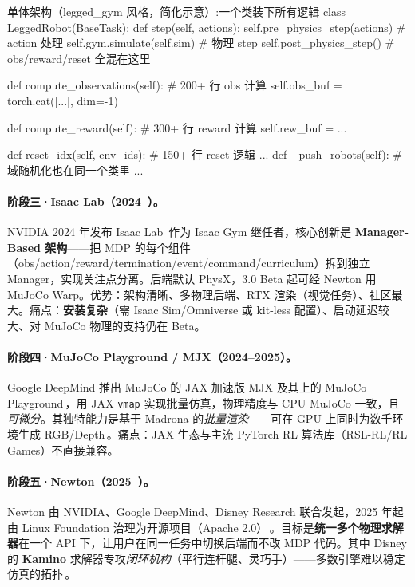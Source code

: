 \begin{codebox}[Python]{单体架构（legged\_gym 风格，简化示意）:一个类装下所有逻辑}
class LeggedRobot(BaseTask):
    def step(self, actions):
        self.pre_physics_step(actions)   # action 处理
        self.gym.simulate(self.sim)      # 物理 step
        self.post_physics_step()         # obs/reward/reset 全混在这里

    def compute_observations(self):      # 200+ 行 obs 计算
        self.obs_buf = torch.cat([...], dim=-1)

    def compute_reward(self):            # 300+ 行 reward 计算
        self.rew_buf = ...

    def reset_idx(self, env_ids):        # 150+ 行 reset 逻辑
        ...
    def _push_robots(self):              # 域随机化也在同一个类里
        ...
\end{codebox}

\paragraph{阶段三·Isaac Lab（2024--）。}NVIDIA 2024 年发布 Isaac Lab\,\cite{mittal2025isaaclab} 作为 Isaac Gym 继任者，核心创新是 \textbf{Manager-Based 架构}——把 MDP 的每个组件（obs/action/reward/termination/event/command/curriculum）拆到独立 Manager，实现关注点分离。后端默认 PhysX，3.0 Beta 起可经 Newton 用 MuJoCo Warp。优势：架构清晰、多物理后端、RTX 渲染（视觉任务）、社区最大。痛点：\textbf{安装复杂}（需 Isaac Sim/Omniverse 或 kit-less 配置）、启动延迟较大、对 MuJoCo 物理的支持仍在 Beta。

\paragraph{阶段四·MuJoCo Playground / MJX（2024--2025）。}Google DeepMind 推出 MuJoCo 的 JAX 加速版 MJX 及其上的 MuJoCo Playground\,\cite{zakka2025playground}，用 JAX \verb|vmap| 实现批量仿真，物理精度与 CPU MuJoCo 一致，且\emph{可微分}。其独特能力是基于 Madrona 的\emph{批量渲染}——可在 GPU 上同时为数千环境生成 RGB/Depth\,\cite{zakka2025playground}。痛点：JAX 生态与主流 PyTorch RL 算法库（RSL-RL/RL Games）不直接兼容。

\paragraph{阶段五·Newton（2025--）。}Newton 由 NVIDIA、Google DeepMind、Disney Research 联合发起，2025 年起由 Linux Foundation 治理为开源项目（Apache 2.0）\,\cite{newton2025}。目标是\textbf{统一多个物理求解器}在一个 API 下，让用户在同一任务中切换后端而不改 MDP 代码。其中 Disney 的 \textbf{Kamino} 求解器专攻\emph{闭环机构}（平行连杆腿、灵巧手）——多数引擎难以稳定仿真的拓扑\,\cite{newton2025}。

